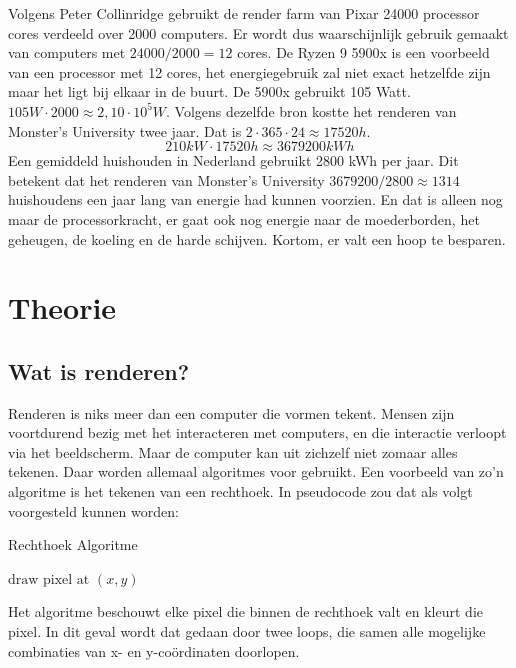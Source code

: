 \documentclass[12pt, a4paper]{article}
\begin{document}
Volgens Peter Collinridge\cite{ScienceBehindPixarRendering} gebruikt de render farm van Pixar 24000 processor cores verdeeld over 2000 computers. Er wordt dus waarschijnlijk gebruik gemaakt van computers met \(24000/2000=12\) cores. De Ryzen 9 5900x is een voorbeeld van een processor met 12 cores, het energiegebruik zal niet exact hetzelfde zijn maar het ligt bij elkaar in de buurt. De 5900x gebruikt 105 Watt. \(105W\cdot 2000\approx 2,10\cdot 10^5W\). Volgens dezelfde bron kostte het renderen van Monster's University twee jaar. Dat is \(2\cdot 365\cdot 24\approx17520h\). \[210kW \cdot 17520h\approx 3679200kWh\] Een gemiddeld huishouden in Nederland gebruikt 2800 kWh per jaar\cite{EnergieGebruik}. Dit betekent dat het renderen van Monster's University \(3679200/2800\approx 1314\) huishoudens een jaar lang van energie had kunnen voorzien. En dat is alleen nog maar de processorkracht, er gaat ook nog energie naar de moederborden, het geheugen, de koeling en de harde schijven. Kortom, er valt een hoop te besparen.
\clearpage
\section{Theorie}
\subsection{Wat is renderen?}
Renderen is niks meer dan een computer die vormen tekent. Mensen zijn voortdurend bezig met het interacteren met computers, en die interactie verloopt via het beeldscherm. Maar de computer kan uit zichzelf niet zomaar alles tekenen. Daar worden allemaal algoritmes voor gebruikt. Een voorbeeld van zo'n algoritme is het tekenen van een rechthoek. In pseudocode zou dat als volgt voorgesteld kunnen worden:
\begin{algorithm}
\caption{Rechthoek Algoritme}
\begin{algorithmic}[1]
		\State $\text{draw pixel at }(x, y)$
	    \EndFor
    \EndFor
\EndProcedure
\end{algorithmic}
\end{algorithm}

Het algoritme beschouwt elke pixel die binnen de rechthoek valt en kleurt die pixel. In dit geval wordt dat gedaan door twee loops, die samen alle mogelijke combinaties van x- en y-coördinaten doorlopen. 
\end{document}
